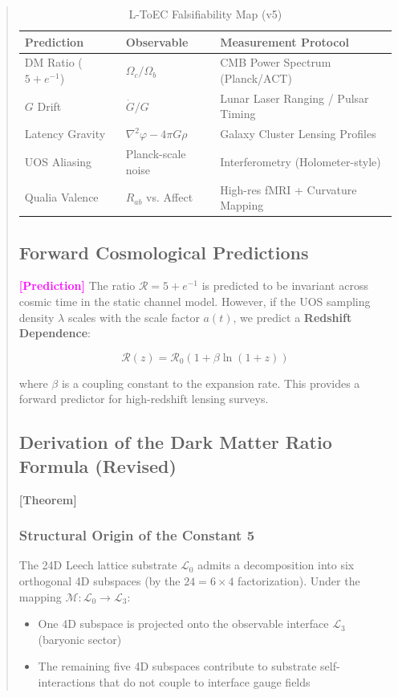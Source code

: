 \documentclass[11pt,titlepage]{article}
\newcommand{\tagtheo}{\textcolor{green!60!black}{\textbf{[Theorem]}} }
\newcommand{\tagpred}{\textcolor{magenta}{\textbf{[Prediction]}} }
\begin{document}
\begin{abstract}
\begin{table}[h!]
\centering
\begin{tabular}{@{}lll@{}}
\toprule
\textbf{Prediction} & \textbf{Observable} & \textbf{Measurement Protocol} \\ \midrule
DM Ratio ($5+e^{-1}$) & $\Omega_c / \Omega_b$ & CMB Power Spectrum (Planck/ACT) \\
$G$ Drift & $\dot{G}/G$ & Lunar Laser Ranging / Pulsar Timing \\
Latency Gravity & $\nabla^2 \varphi - 4\pi G \rho$ & Galaxy Cluster Lensing Profiles \\
UOS Aliasing & Planck-scale noise & Interferometry (Holometer-style) \\
Qualia Valence & $R_{ab}$ vs. Affect & High-res fMRI + Curvature Mapping \\ \bottomrule
\end{tabular}
\caption{L-ToEC Falsifiability Map (v5)}
\end{table}


\subsection{Forward Cosmological Predictions}
\tagpred The ratio $\mathcal{R} = 5 + e^{-1}$ is predicted to be invariant across cosmic time in the static channel model. However, if the UOS sampling density $\lambda$ scales with the scale factor $a(t)$, we predict a \textbf{Redshift Dependence}:

\begin{equation}
\mathcal{R}(z) = \mathcal{R}_0 (1 + \beta \ln(1+z))
\end{equation}

where $\beta$ is a coupling constant to the expansion rate. This provides a forward predictor for high-redshift lensing surveys.

\subsection{Derivation of the Dark Matter Ratio Formula (Revised)}
\tagtheo \label{deriv:dm-ratio-revised} 

\subsubsection{Structural Origin of the Constant 5}
The 24D Leech lattice substrate $\mathcal{L}_0$ admits a decomposition into six orthogonal 4D subspaces (by the $24 = 6 \times 4$ factorization). Under the mapping $\mathcal{M}: \mathcal{L}_0 \to \mathcal{L}_3$:
\begin{itemize}
    \item One 4D subspace is projected onto the observable interface $\mathcal{L}_3$ (baryonic sector)
    \item The remaining five 4D subspaces contribute to substrate self-interactions that do not couple to interface gauge fields
\end{itemize}


\end{abstract}
\end{document}
